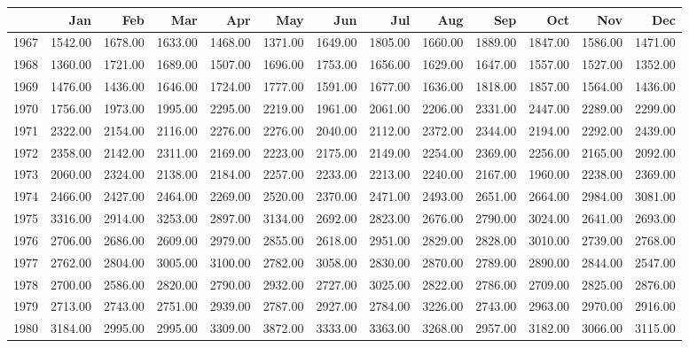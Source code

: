\begin{longtable}{rrrrrrrrrrrrr}
  \hline
 & Jan & Feb & Mar & Apr & May & Jun & Jul & Aug & Sep & Oct & Nov & Dec \\ 
  \hline
1967 & 1542.00 & 1678.00 & 1633.00 & 1468.00 & 1371.00 & 1649.00 & 1805.00 & 1660.00 & 1889.00 & 1847.00 & 1586.00 & 1471.00 \\ 
  1968 & 1360.00 & 1721.00 & 1689.00 & 1507.00 & 1696.00 & 1753.00 & 1656.00 & 1629.00 & 1647.00 & 1557.00 & 1527.00 & 1352.00 \\ 
  1969 & 1476.00 & 1436.00 & 1646.00 & 1724.00 & 1777.00 & 1591.00 & 1677.00 & 1636.00 & 1818.00 & 1857.00 & 1564.00 & 1436.00 \\ 
  1970 & 1756.00 & 1973.00 & 1995.00 & 2295.00 & 2219.00 & 1961.00 & 2061.00 & 2206.00 & 2331.00 & 2447.00 & 2289.00 & 2299.00 \\ 
  1971 & 2322.00 & 2154.00 & 2116.00 & 2276.00 & 2276.00 & 2040.00 & 2112.00 & 2372.00 & 2344.00 & 2194.00 & 2292.00 & 2439.00 \\ 
  1972 & 2358.00 & 2142.00 & 2311.00 & 2169.00 & 2223.00 & 2175.00 & 2149.00 & 2254.00 & 2369.00 & 2256.00 & 2165.00 & 2092.00 \\ 
  1973 & 2060.00 & 2324.00 & 2138.00 & 2184.00 & 2257.00 & 2233.00 & 2213.00 & 2240.00 & 2167.00 & 1960.00 & 2238.00 & 2369.00 \\ 
  1974 & 2466.00 & 2427.00 & 2464.00 & 2269.00 & 2520.00 & 2370.00 & 2471.00 & 2493.00 & 2651.00 & 2664.00 & 2984.00 & 3081.00 \\ 
  1975 & 3316.00 & 2914.00 & 3253.00 & 2897.00 & 3134.00 & 2692.00 & 2823.00 & 2676.00 & 2790.00 & 3024.00 & 2641.00 & 2693.00 \\ 
  1976 & 2706.00 & 2686.00 & 2609.00 & 2979.00 & 2855.00 & 2618.00 & 2951.00 & 2829.00 & 2828.00 & 3010.00 & 2739.00 & 2768.00 \\ 
  1977 & 2762.00 & 2804.00 & 3005.00 & 3100.00 & 2782.00 & 3058.00 & 2830.00 & 2870.00 & 2789.00 & 2890.00 & 2844.00 & 2547.00 \\ 
  1978 & 2700.00 & 2586.00 & 2820.00 & 2790.00 & 2932.00 & 2727.00 & 3025.00 & 2822.00 & 2786.00 & 2709.00 & 2825.00 & 2876.00 \\ 
  1979 & 2713.00 & 2743.00 & 2751.00 & 2939.00 & 2787.00 & 2927.00 & 2784.00 & 3226.00 & 2743.00 & 2963.00 & 2970.00 & 2916.00 \\ 
  1980 & 3184.00 & 2995.00 & 2995.00 & 3309.00 & 3872.00 & 3333.00 & 3363.00 & 3268.00 & 2957.00 & 3182.00 & 3066.00 & 3115.00 \\ 

\end{longtable}
